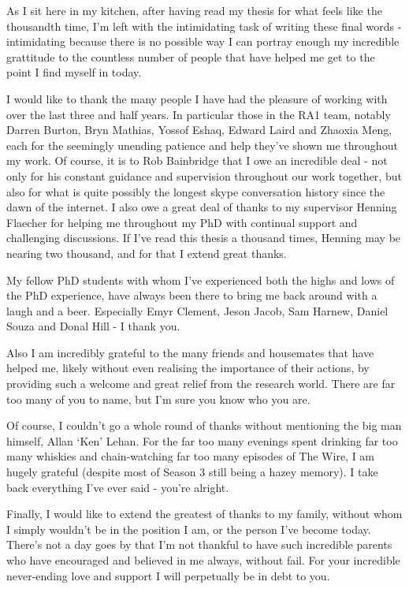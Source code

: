 
\begin{acknowledgements}      

\begin{spacing}{1}
As I sit here in my kitchen, after having read my thesis for what feels like
the
thousandth time, I'm left with the intimidating task of writing these final
words - intimidating because there is no possible way I can portray enough my
incredible grattitude to the countless number of people that have helped me
get to the point I find myself in today.

I would like to thank the many people I have had the pleasure of working with
over the last three and half years. In particular those in
the RA1 team, notably Darren Burton, Bryn Mathias, Yossof Eshaq, Edward
Laird and Zhaoxia Meng, each for the seemingly unending patience and help
they've shown me throughout my work. Of course, it is to Rob Bainbridge that I
owe an incredible deal - not only for his constant guidance and supervision
throughout our work together, but also for what is quite possibly the longest
skype conversation history since the dawn of the internet.
I also owe a great deal of thanks to my supervisor Henning Flaecher for helping
me throughout my PhD with continual support and challenging discussions. If I've
read this thesis a thousand times, Henning may be nearing two thousand, and for
that I extend great thanks.

My fellow PhD students with whom I've experienced both the highs and lows of
the PhD experience, have always been there to bring me back around with a laugh
and a beer. Especially Emyr Clement, Jeson Jacob, Sam Harnew, Daniel Souza and
Donal Hill - I thank you.

Also I am incredibly grateful to the many friends and housemates that have helped me, likely without
even realising the importance of their actions, by
providing such a welcome and great relief from the research world. There are
far too many of you to name, but I'm sure you know who you are.

Of course, I couldn't go a whole round of thanks without mentioning the big man
himself, Allan `Ken' Lehan. For the far too many evenings spent
drinking far too many whiskies and chain-watching far too many episodes of The
Wire, I am hugely grateful (despite most of Season 3 still being a hazey
memory). I take back everything I've ever said - you're alright.

Finally, I would like to extend the greatest of thanks to my family, without whom
I simply wouldn't be in the position I am, or the person I've become today.
There's not a day goes by that I'm not thankful to have such incredible parents
who have encouraged and believed in me always, without fail.
For your incredible never-ending love and support I will perpetually be in debt
to you.
\end{spacing}

\end{acknowledgements}

